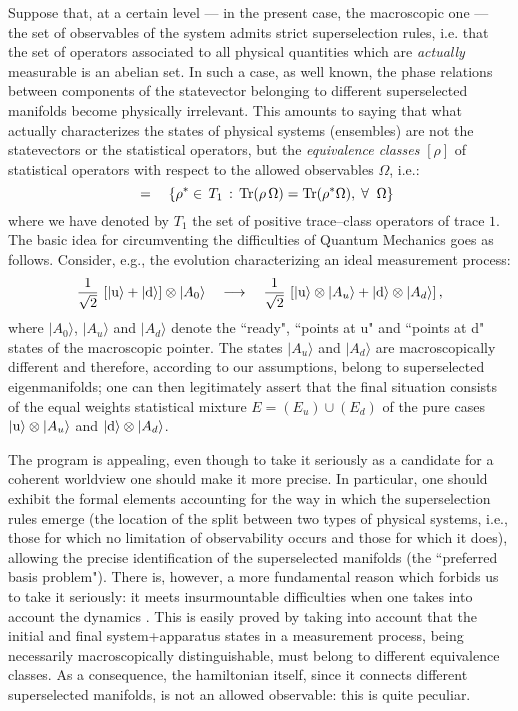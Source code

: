 \documentclass[12pt]{article}
\begin{document}
Suppose that, at a certain level --- in the present case, the
macroscopic one --- the set of observables of the system admits
strict superselection rules, i.e. that the set of operators associated to
all physical quantities which are {\it actually} measurable is an abelian
set. In such a case, as well known, the phase relations between
components of the statevector belonging to different superselected
manifolds become physically irrelevant. This amounts to saying that what
actually characterizes the states of physical systems (ensembles) are not
the statevectors or the statistical operators, but the {\it equivalence
classes} $[\rho]$ of statistical operators with respect to the allowed
observables $\Omega$, i.e.:
\begin{equation}
[\rho] \quad = \quad \left\{\rho^{*}\in\, T_{1} \, :\,
\makebox{Tr}(\rho\,\Omega) = \makebox{Tr}(\rho^{*}\Omega),
\;\forall\;\; \Omega\right\}
\end{equation}
where we have denoted by $T_{1}$ the set of positive trace--class
operators of trace $1$. The basic idea for circumventing the
difficulties of Quantum Mechanics goes as follows. Consider, e.g.,
the evolution characterizing an ideal measurement process:
\begin{equation} \label{se}
\frac{1}{\sqrt{2}}\,\left[ |\makebox{u}\rangle +
|\makebox{d}\rangle \right]\otimes |A_{0}\rangle
\quad\longrightarrow\quad \frac{1}{\sqrt{2}}\,\left[
|\makebox{u}\rangle \otimes |A_{u}\rangle + |\makebox{d}\rangle
\otimes |A_{d}\rangle \right],
\end{equation}
where $|A_{0}\rangle$, $|A_{u}\rangle$ and $|A_{d}\rangle$ denote
the ``ready", ``points at u" and ``points at d" states of the
macroscopic pointer. The states $|A_{u}\rangle$ and
$|A_{d}\rangle$ are macroscopically different and therefore,
according to our assumptions, belong to superselected
eigenmanifolds; one can then legitimately assert that the final
situation consists of the equal weights statistical mixture
$E=(E_{u})\cup (E_{d})$ of the pure cases
$|\makebox{u}\rangle\otimes |A_{u}\rangle$ and
$|\makebox{d}\rangle\otimes |A_{d}\rangle$.

The program is appealing, even though to take it seriously as a
candidate for a coherent worldview one should make it more
precise. In particular, one should exhibit the formal elements
accounting for the way in which the superselection rules emerge
(the location of the split between two types of physical systems,
i.e., those for which no limitation of observability occurs and
those for which it does), allowing the precise identification of
the superselected manifolds (the ``preferred basis problem").
There is, however, a more fundamental reason which forbids us to
take it seriously: it meets insurmountable difficulties when one
takes into account the dynamics \cite{blm}. This is easily proved
by taking into account that the initial and final system+apparatus states
in a measurement process, being necessarily macroscopically
distinguishable, must belong to different equivalence classes. As
a consequence, the hamiltonian itself, since it connects different
superselected manifolds, is not an allowed observable: this is
quite peculiar.
\end{document}
